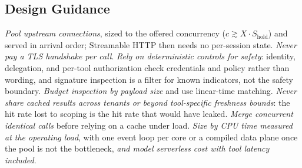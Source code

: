 \documentclass{ieeeaccess}
\begin{document}
\subsection{Design Guidance}
\emph{Pool upstream connections}, sized to the offered concurrency ($c \gtrsim X \cdot S_{\mathrm{hold}}$) and served in arrival order; Streamable HTTP then needs no per-session state. \emph{Never pay a TLS handshake per call}. \emph{Rely on deterministic controls for safety}: identity, delegation, and per-tool authorization check credentials and policy rather than wording, and signature inspection is a filter for known indicators, not the safety boundary. \emph{Budget inspection by payload size} and use linear-time matching. \emph{Never share cached results across tenants or beyond tool-specific freshness bounds}: the hit rate lost to scoping is the hit rate that would have leaked. \emph{Merge concurrent identical calls} before relying on a cache under load. \emph{Size by CPU time measured at the operating load}, with one event loop per core or a compiled data plane once the pool is not the bottleneck, \emph{and model serverless cost with tool latency included}.
\end{document}
